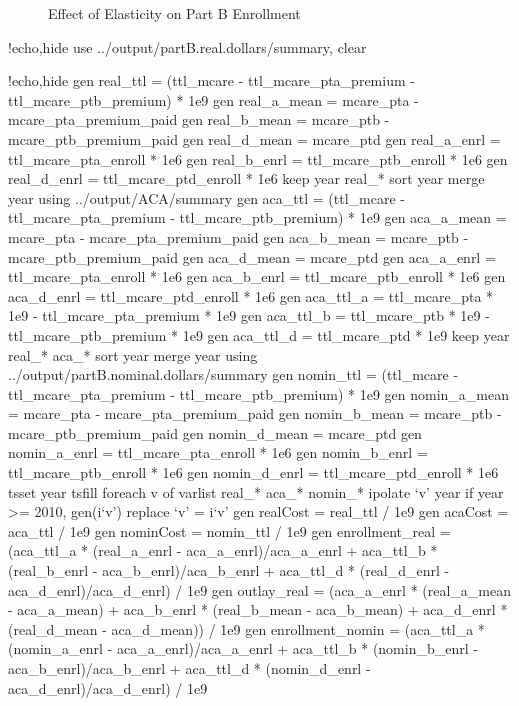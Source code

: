\documentclass{article}
\begin{document}
\begin{figure}[ht]
\centering
{}
\caption{Effect of Elasticity on Part B Enrollment}
\end{figure}


\begin{Statacode}{!echo,hide}
use ../output/partB.real.dollars/summary, clear
\end{Statacode}
\begin{Statacode}{!echo,hide}
gen real_ttl = (ttl_mcare - ttl_mcare_pta_premium - ttl_mcare_ptb_premium) * 1e9
gen real_a_mean = mcare_pta - mcare_pta_premium_paid
gen real_b_mean = mcare_ptb - mcare_ptb_premium_paid
gen real_d_mean = mcare_ptd
gen real_a_enrl = ttl_mcare_pta_enroll * 1e6
gen real_b_enrl = ttl_mcare_ptb_enroll * 1e6
gen real_d_enrl = ttl_mcare_ptd_enroll * 1e6
keep year real_*
sort year
merge year using ../output/ACA/summary
gen aca_ttl = (ttl_mcare - ttl_mcare_pta_premium - ttl_mcare_ptb_premium) * 1e9
gen aca_a_mean = mcare_pta - mcare_pta_premium_paid
gen aca_b_mean = mcare_ptb - mcare_ptb_premium_paid
gen aca_d_mean = mcare_ptd
gen aca_a_enrl = ttl_mcare_pta_enroll * 1e6
gen aca_b_enrl = ttl_mcare_ptb_enroll * 1e6
gen aca_d_enrl = ttl_mcare_ptd_enroll * 1e6
gen aca_ttl_a = ttl_mcare_pta * 1e9 - ttl_mcare_pta_premium * 1e9
gen aca_ttl_b = ttl_mcare_ptb * 1e9 - ttl_mcare_ptb_premium * 1e9
gen aca_ttl_d = ttl_mcare_ptd * 1e9
keep year real_* aca_*
sort year
merge year using ../output/partB.nominal.dollars/summary
gen nomin_ttl = (ttl_mcare - ttl_mcare_pta_premium - ttl_mcare_ptb_premium) * 1e9
gen nomin_a_mean = mcare_pta - mcare_pta_premium_paid
gen nomin_b_mean = mcare_ptb - mcare_ptb_premium_paid
gen nomin_d_mean = mcare_ptd
gen nomin_a_enrl = ttl_mcare_pta_enroll * 1e6
gen nomin_b_enrl = ttl_mcare_ptb_enroll * 1e6
gen nomin_d_enrl = ttl_mcare_ptd_enroll * 1e6
tsset year
tsfill
foreach v of varlist real_* aca_* nomin_* {
  ipolate `v' year if year >= 2010, gen(i`v')
  replace `v' = i`v'
}
gen realCost = real_ttl / 1e9
gen acaCost = aca_ttl / 1e9
gen nominCost = nomin_ttl / 1e9
gen enrollment_real = (aca_ttl_a * (real_a_enrl - aca_a_enrl)/aca_a_enrl + aca_ttl_b * (real_b_enrl - aca_b_enrl)/aca_b_enrl + aca_ttl_d * (real_d_enrl - aca_d_enrl)/aca_d_enrl) / 1e9
gen outlay_real = (aca_a_enrl * (real_a_mean - aca_a_mean) + aca_b_enrl * (real_b_mean - aca_b_mean) + aca_d_enrl * (real_d_mean - aca_d_mean)) / 1e9
gen enrollment_nomin = (aca_ttl_a * (nomin_a_enrl - aca_a_enrl)/aca_a_enrl + aca_ttl_b * (nomin_b_enrl - aca_b_enrl)/aca_b_enrl + aca_ttl_d * (nomin_d_enrl - aca_d_enrl)/aca_d_enrl) / 1e9

\end{Statacode}
\end{document}

